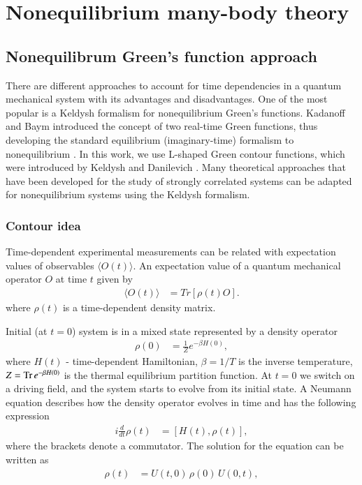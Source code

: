 
\chapter{Nonequilibrium many-body theory}
\label{chap:Non_mb_th}

\section{Nonequilibrum Green's function approach}

There are different approaches to account for time dependencies in a quantum mechanical system with its advantages and disadvantages. One of the most popular is a Keldysh formalism for nonequilibrium Green's functions. Kadanoff and Baym \citep{bookKadanoff_and_Baym} introduced the concept of two real-time Green functions, thus developing the standard equilibrium (imaginary-time) formalism \citep{Abrikosov:107441} to nonequilibrium \citep{10.1063/1.1703727}. In this work, we use L-shaped Green contour functions, which were introduced by Keldysh \citep{Keldysh:1964ud} and Danilevich \citep{DANIELEWICZ1984239}. Many theoretical approaches that have been developed for the study of strongly correlated systems can be adapted for nonequilibrium systems using the Keldysh formalism.

\FloatBarrier

\subsection{Contour idea}
	
Time-dependent experimental measurements can be related with expectation values of observables $\langle{O(t)}\rangle$. An expectation value of a quantum mechanical operator $O$ at time $t$ given by 
\begin{align}
\langle O(t)\rangle
 &=
  Tr[\rho(t)O].
\label{expectation value}
\end{align}
where $\rho(t)$ is a time-dependent density matrix. 

Initial (at $t=0$) system is in a mixed state represented by a density operator
\begin{align}
\rho(0)
&=
  \frac{1}{Z}e^{-\beta H(0)},
\label{rho0}
\end{align}
where $H(t)$ - time-dependent Hamiltonian, $\beta=1/T$ is the inverse temperature, $Z={\rm Tr}\, e^{-\beta H(0)}$ is the thermal equilibrium partition function.
At $t=0$ we switch on a driving field, and the system starts to evolve from its initial state. 
A Neumann equation describes how the density operator evolves in time and has the following expression
\begin{align}
i\frac{d}{dt}\rho(t)
 &=
  [H(t),\rho(t)],
\label{von Neumann}
\end{align}
where the brackets denote a commutator. The solution for the equation can be written as 
\begin{align}
\rho(t)
&= U(t,0)\, \rho(0) \, U(0,t),
\label{formal rho}
\end{align}

